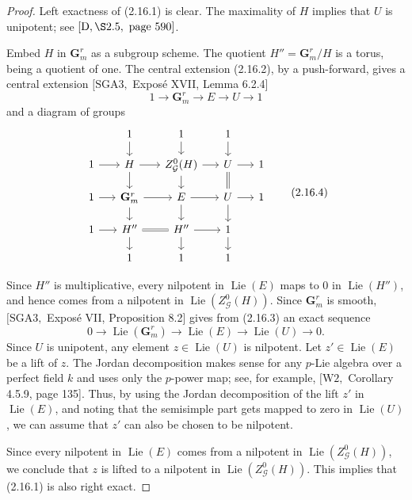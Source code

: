 \documentclass[11pt]{article}
\newcommand{\Lie}{\operatorname{Lie}}
\newcommand{\Gm}{\mathbf G_m}
\begin{document}
\begin{proof}
Left exactness of (2.16.1) is clear. The maximality of \(H\) implies that \(U\) is
unipotent; see \([\mathrm D,\S2.5,\text{ page }590]\).

Embed \(H\) in \(\Gm^r\) as a subgroup scheme. The quotient \(H''=\Gm^r/H\) is a
torus, being a quotient of one. The central extension (2.16.2), by a push-forward,
gives a central extension \([\mathrm{SGA3},\) Exposé XVII, Lemma 6.2.4]
\begin{equation}
1\longrightarrow \Gm^r\longrightarrow E\longrightarrow U\longrightarrow 1
\tag{2.16.3}
\end{equation}
and a diagram of groups
\begin{equation}
\begin{tikzcd}[column sep=1.5em,row sep=1.2em]
 & 1 \arrow[d] & 1 \arrow[d] & 1 \arrow[d] & \\
1 \arrow[r] & H \arrow[r] \arrow[d] & Z^0_{\mathcal G}(H) \arrow[r] \arrow[d] & U \arrow[r] \arrow[d,equal] & 1 \\
1 \arrow[r] & \Gm^r \arrow[r] \arrow[d] & E \arrow[r] \arrow[d] & U \arrow[r] \arrow[d] & 1 \\
1 \arrow[r] & H'' \arrow[r,equal] \arrow[d] & H'' \arrow[r] \arrow[d] & 1 \arrow[d] & \\
 & 1 & 1 & 1 &
\end{tikzcd}
\tag{2.16.4}
\end{equation}

Since \(H''\) is multiplicative, every nilpotent in \(\Lie(E)\) maps to \(0\) in
\(\Lie(H'')\), and hence comes from a nilpotent in \(\Lie(Z^0_{\mathcal G}(H))\).
Since \(\Gm^r\) is smooth, \([\mathrm{SGA3},\) Exposé VII, Proposition 8.2] gives from
(2.16.3) an exact sequence
\begin{equation}
0\longrightarrow \Lie(\Gm^r)\longrightarrow \Lie(E)\longrightarrow \Lie(U)
\longrightarrow 0.
\tag{2.16.5}
\end{equation}
Since \(U\) is unipotent, any element \(z\in\Lie(U)\) is nilpotent. Let \(z'\in\Lie(E)\)
be a lift of \(z\). The Jordan decomposition makes sense for any \(p\)-Lie algebra over
a perfect field \(k\) and uses only the \(p\)-power map; see, for example,
\([\mathrm{W2},\) Corollary 4.5.9, page 135]. Thus, by using the Jordan decomposition
of the lift \(z'\) in \(\Lie(E)\), and noting that the semisimple part gets mapped to
zero in \(\Lie(U)\), we can assume that \(z'\) can also be chosen to be nilpotent.

Since every nilpotent in \(\Lie(E)\) comes from a nilpotent in
\(\Lie(Z^0_{\mathcal G}(H))\), we conclude that \(z\) is lifted to a nilpotent in
\(\Lie(Z^0_{\mathcal G}(H))\). This implies that (2.16.1) is also right exact.
\end{proof}
\end{document}
